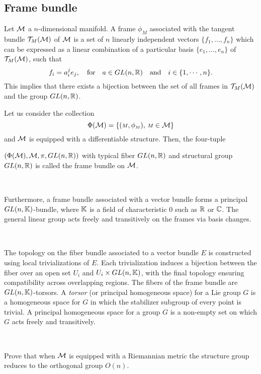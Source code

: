 \subsection{Frame bundle}
Let $\mathcal{M}$ a $n$-dimensional manifold. A frame $\phi_{\scriptscriptstyle M}$ associated with the tangent bundle $\mathcal{T}_{\scriptstyle M}(\mathcal{M})$ of $\mathcal{M}$ is a set of $n$ linearly independent vectors $\{f_{1},\dots,f_{n}\}$ which can be expressed as a linear combination of a particular basis  $\{e_{1},\dots,e_{n}\}$ of  $\mathcal{T}_{\scriptstyle M}(\mathcal{M})$, such that 
\[f_{i}=a_{i}^{j}e_{j},\quad \text{for}\quad a \in GL(n,\mathbb{R})\quad \text{and}\quad i\in \{1,\cdots, n\}. \]
This implies that there exists a bijection between the set of all frames in  $\mathcal{T}_{\scriptstyle M}(\mathcal{M})$ and the group $GL(n,\mathbb{R})$.

\begin{definition}
Let us consider the collection \[\Phi(\mathcal{M})=\{({\scriptstyle M},\phi_{\scriptscriptstyle M}),\, {\scriptstyle M}\in \mathcal{M}\}\] and $\mathcal{M}$ is equipped with a differentiable structure. Then, the four-tuple 

$(\Phi(\mathcal{M}),\mathcal{M},\pi, GL(n,\mathbb{R}))$ 
with typical fiber $GL(n,\mathbb{R})$ and structural group $GL(n,\mathbb{R})$ is called the frame bundle on $\mathcal{M}$.
\end{definition}

\, 

Furthermore, a frame bundle associated with a vector bundle 
forms  a principal $GL(n,\mathbb{K})$-bundle, where $\mathbb{K}$ is a field of characteristic 0 such as $\mathbb{R}$ or $\mathbb{C}$. The general linear group acts freely and transitively on the frames via basis changes. 

\, 

The topology on the fiber bundle associated to a vector bundle $E$
 is constructed using local trivializations of 
$E$. Each trivialization induces a bijection between the fiber over 
an open set $U_i$ and $U_i\times GL(n,\mathbb{K})$, with the final topology ensuring compatibility across overlapping regions.
The fibers of the frame bundle are $GL(n,\mathbb{K})$-torsors. A \emph{torsor} (or  principal homogeneous space) for a Lie group $G$ is a homogeneous space for $G$ in which the stabilizer subgroup of every point is trivial. A principal homogeneous space for a group $G$ is a non-empty set on which $G$ acts freely and transitively. 

\, 
\begin{ex}
Prove that when $\mathcal{M}$ is equipped with a Riemannian metric the  structure group reduces to the orthogonal group 
$O(n)$.  
\end{ex}


